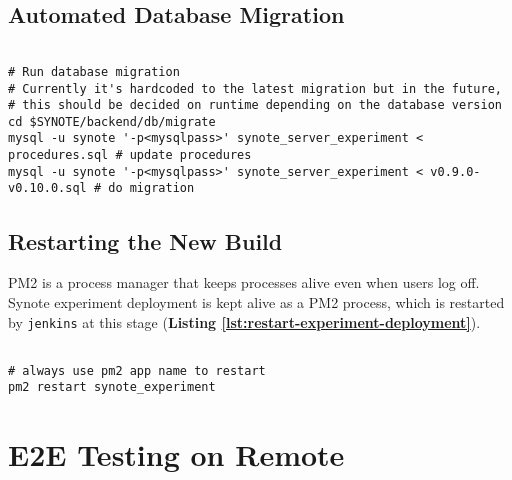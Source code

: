 \subsection{Automated Database Migration}
\label{subsec:automated-database-migration}

\begin{listing}[H]
\begin{verbatim}

# Run database migration
# Currently it's hardcoded to the latest migration but in the future,
# this should be decided on runtime depending on the database version
cd $SYNOTE/backend/db/migrate
mysql -u synote '-p<mysqlpass>' synote_server_experiment < procedures.sql # update procedures
mysql -u synote '-p<mysqlpass>' synote_server_experiment < v0.9.0-v0.10.0.sql # do migration

\end{verbatim}
\label{lst:automated-db-migration}
\end{listing}

\subsection{Restarting the New Build}
\label{subsec:restarting-the-new-build}

PM2 is a process manager that keeps processes alive even when users log off. Synote experiment deployment is kept alive as a PM2 process, which is restarted by \texttt{jenkins} at this stage (\textbf{Listing \ref{lst:restart-experiment-deployment}}).

\begin{listing}[H]
\begin{verbatim}

# always use pm2 app name to restart
pm2 restart synote_experiment

\end{verbatim}
\label{lst:restart-experiment-deployment}
\end{listing}

\section{E2E Testing on Remote}
\label{subsec:e2e-testing-on-remote}

